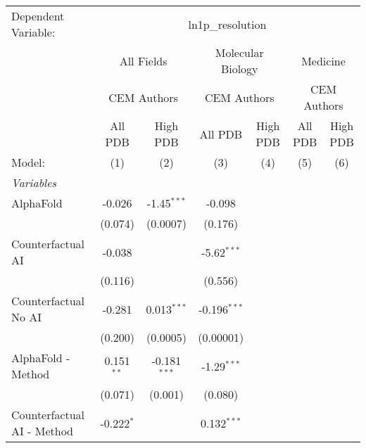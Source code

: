 \begingroup
\centering
\begin{tabular}{lcccccc}
   \tabularnewline \midrule \midrule
   Dependent Variable: & \multicolumn{6}{c}{ln1p\_resolution}\\
 & \multicolumn{2}{c}{All Fields} & \multicolumn{2}{c}{Molecular Biology} & \multicolumn{2}{c}{Medicine} \\
\cmidrule(lr){2-3} \cmidrule(lr){4-5} \cmidrule(lr){6-7}
 & \multicolumn{2}{c}{CEM Authors} & \multicolumn{2}{c}{CEM Authors} & \multicolumn{2}{c}{CEM Authors} \\
\cmidrule(lr){2-3} \cmidrule(lr){4-5} \cmidrule(lr){6-7}
 & \multicolumn{1}{c}{All PDB} & \multicolumn{1}{c}{High PDB} & \multicolumn{1}{c}{All PDB} & \multicolumn{1}{c}{High PDB} & \multicolumn{1}{c}{All PDB} & \multicolumn{1}{c}{High PDB} \\
\cmidrule(lr){2-2} \cmidrule(lr){3-3} \cmidrule(lr){4-4} \cmidrule(lr){5-5} \cmidrule(lr){6-6} \cmidrule(lr){7-7}
   Model:                                   & (1)          & (2)            & (3)            & (4) & (5) & (6)\\  
   \midrule
   \emph{Variables}\\
   AlphaFold                                & -0.026       & -1.45$^{***}$  & -0.098         &     &     &   \\   
                                            & (0.074)      & (0.0007)       & (0.176)        &     &     &   \\   
   Counterfactual AI                        & -0.038       &                & -5.62$^{***}$  &     &     &   \\   
                                            & (0.116)      &                & (0.556)        &     &     &   \\   
   Counterfactual No AI                     & -0.281       & 0.013$^{***}$  & -0.196$^{***}$ &     &     &   \\   
                                            & (0.200)      & (0.0005)       & (0.00001)      &     &     &   \\   
   AlphaFold - Method                       & 0.151$^{**}$ & -0.181$^{***}$ & -1.29$^{***}$  &     &     &   \\   
                                            & (0.071)      & (0.001)        & (0.080)        &     &     &   \\   
   Counterfactual AI - Method               & -0.222$^{*}$ &                & 0.132$^{***}$  &     &     &   \\   

\end{tabular}
